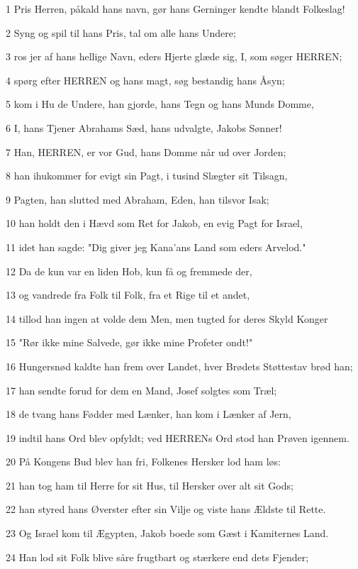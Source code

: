 \par 1 Pris Herren, påkald hans navn, gør hans Gerninger kendte blandt Folkeslag!
\par 2 Syng og spil til hans Pris, tal om alle hans Undere;
\par 3 ros jer af hans hellige Navn, eders Hjerte glæde sig, I, som søger HERREN;
\par 4 spørg efter HERREN og hans magt, søg bestandig hans Åsyn;
\par 5 kom i Hu de Undere, han gjorde, hans Tegn og hans Munds Domme,
\par 6 I, hans Tjener Abrahams Sæd, hans udvalgte, Jakobs Sønner!
\par 7 Han, HERREN, er vor Gud, hans Domme når ud over Jorden;
\par 8 han ihukommer for evigt sin Pagt, i tusind Slægter sit Tilsagn,
\par 9 Pagten, han slutted med Abraham, Eden, han tilsvor Isak;
\par 10 han holdt den i Hævd som Ret for Jakob, en evig Pagt for Israel,
\par 11 idet han sagde: "Dig giver jeg Kana'ans Land som eders Arvelod."
\par 12 Da de kun var en liden Hob, kun få og fremmede der,
\par 13 og vandrede fra Folk til Folk, fra et Rige til et andet,
\par 14 tillod han ingen at volde dem Men, men tugted for deres Skyld Konger
\par 15 "Rør ikke mine Salvede, gør ikke mine Profeter ondt!"
\par 16 Hungersnød kaldte han frem over Landet, hver Brødets Støttestav brød han;
\par 17 han sendte forud for dem en Mand, Josef solgtes som Træl;
\par 18 de tvang hans Fødder med Lænker, han kom i Lænker af Jern,
\par 19 indtil hans Ord blev opfyldt; ved HERRENs Ord stod han Prøven igennem.
\par 20 På Kongens Bud blev han fri, Folkenes Hersker lod ham løs:
\par 21 han tog ham til Herre for sit Hus, til Hersker over alt sit Gods;
\par 22 han styred hans Øverster efter sin Vilje og viste hans Ældste til Rette.
\par 23 Og Israel kom til Ægypten, Jakob boede som Gæst i Kamiternes Land.
\par 24 Han lod sit Folk blive såre frugtbart og stærkere end dets Fjender;
